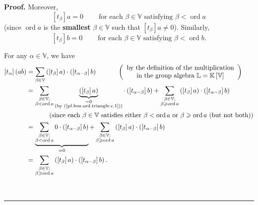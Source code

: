 \documentclass[numbers=enddot,12pt,final,onecolumn,notitlepage]{scrartcl}%
\theoremstyle{definition}
\newenvironment{proof}[1][Proof]{\noindent\textbf{#1.} }{\ \rule{0.5em}{0.5em}}
\let\sumnonlimits\sum
\renewcommand{\sum}{\sumnonlimits\limits}
\renewcommand{\geq}{\geqslant}
\theoremstyle{plainsl}
\begin{document}
\begin{proof}
Moreover,
\begin{equation}
\left[  t_{\beta}\right]  a=0\ \ \ \ \ \ \ \ \ \ \text{for each }\beta
\in\mathbb{V}\text{ satisfying }\beta<\operatorname*{ord}a
\label{pf.lem.ord.triangle.c.1}%
\end{equation}
(since $\operatorname*{ord}a$ is the \textbf{smallest} $\beta\in\mathbb{V}$
such that $\left[  t_{\beta}\right]  a\neq0$). Similarly,%
\begin{equation}
\left[  t_{\beta}\right]  b=0\ \ \ \ \ \ \ \ \ \ \text{for each }\beta
\in\mathbb{V}\text{ satisfying }\beta<\operatorname*{ord}b.
\label{pf.lem.ord.triangle.c.2}%
\end{equation}


For any $\alpha\in\mathbb{V}$, we have%
\begin{align}
\left[  t_{\alpha}\right]  \left(  ab\right)   &  =\sum_{\beta\in\mathbb{V}%
}\left(  \left[  t_{\beta}\right]  a\right)  \cdot\left(  \left[
t_{\alpha-\beta}\right]  b\right)  \ \ \ \ \ \ \ \ \ \ \left(
\begin{array}
[c]{c}%
\text{by the definition of the multiplication}\\
\text{in the group algebra }\mathbb{L}=\mathbb{K}\left[  \mathbb{V}\right]
\end{array}
\right) \nonumber\\
&  =\sum_{\substack{\beta\in\mathbb{V};\\\beta<\operatorname*{ord}%
a}}\underbrace{\left(  \left[  t_{\beta}\right]  a\right)  }%
_{\substack{=0\\\text{(by (\ref{pf.lem.ord.triangle.c.1}))}}}\cdot\left(
\left[  t_{\alpha-\beta}\right]  b\right)  +\sum_{\substack{\beta\in
\mathbb{V};\\\beta\geq\operatorname*{ord}a}}\left(  \left[  t_{\beta}\right]
a\right)  \cdot\left(  \left[  t_{\alpha-\beta}\right]  b\right) \nonumber\\
&  \ \ \ \ \ \ \ \ \ \ \left(  \text{since each }\beta\in\mathbb{V}\text{
satisfies either }\beta<\operatorname*{ord}a\text{ or }\beta\geq
\operatorname*{ord}a\text{ (but not both)}\right) \nonumber\\
&  =\underbrace{\sum_{\substack{\beta\in\mathbb{V};\\\beta<\operatorname*{ord}%
a}}0\cdot\left(  \left[  t_{\alpha-\beta}\right]  b\right)  }_{=0}%
+\sum_{\substack{\beta\in\mathbb{V};\\\beta\geq\operatorname*{ord}a}}\left(
\left[  t_{\beta}\right]  a\right)  \cdot\left(  \left[  t_{\alpha-\beta
}\right]  b\right) \nonumber\\
&  =\sum_{\substack{\beta\in\mathbb{V};\\\beta\geq\operatorname*{ord}%
a}}\left(  \left[  t_{\beta}\right]  a\right)  \cdot\left(  \left[
t_{\alpha-\beta}\right]  b\right)  . \label{pf.lem.ord.triangle.c.3}%
\end{align}



\end{proof}
\end{document}
